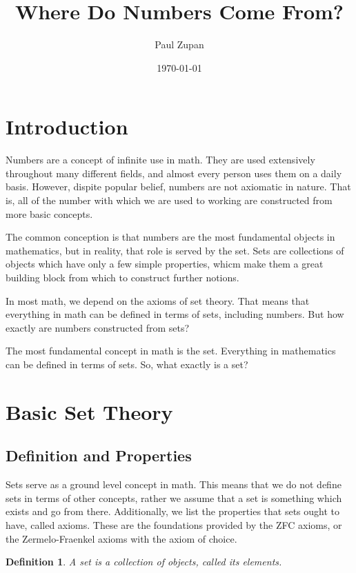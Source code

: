 \documentclass[12pt, titlepage]{article}
\title{Where Do Numbers Come From?}
\author{Paul Zupan}
\date{\today}
\newtheorem{definition}{Definition}
\begin{document}
\maketitle
\tableofcontents
\newpage

\section{Introduction}


Numbers are a concept of infinite use in math. They are used extensively
throughout many different fields, and almost every person uses them on a daily
basis. However, dispite popular belief, numbers are not axiomatic in nature.
That is, all of the number with which we are used to working are constructed
from more basic concepts.

The common conception is that numbers are the most fundamental objects in
mathematics, but in reality, that role is served by the set. Sets are
collections of objects which have only a few simple properties, whicm make them
a great building block from which to construct further notions.

In most math, we depend on the axioms of set theory. That means that everything
in math can be defined in terms of sets, including numbers. But how exactly are
numbers constructed from sets?

The most fundamental concept in math is the set. Everything in mathematics can
be defined in terms of sets. So, what exactly is a set?

\section{Basic Set Theory}

\subsection{Definition and Properties}

Sets serve as a ground level concept in math. This means that we do not define
sets in terms of other concepts, rather we assume that a set is something which
exists and go from there. Additionally, we list the properties that sets ought
to have, called axioms. These are the foundations provided by the ZFC axioms,
or the Zermelo-Fraenkel axioms with the axiom of choice.

\begin{definition}
  A set is a collection of objects, called its elements.
\end{definition}
\end{document}
